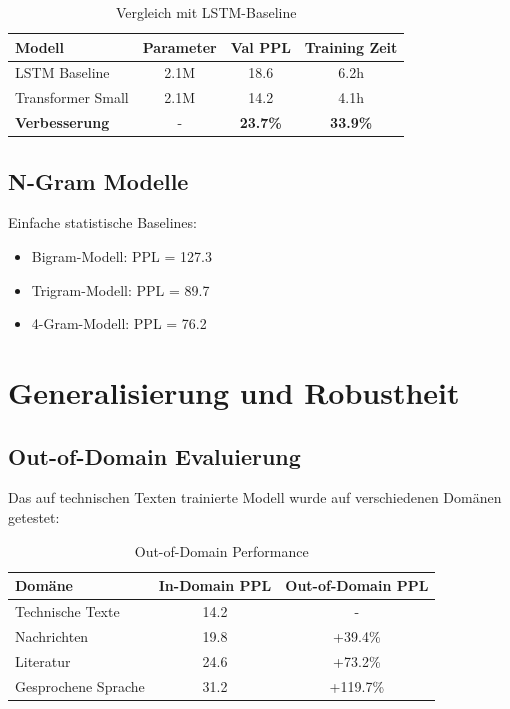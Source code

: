 \begin{table}[h]
\centering
\begin{tabular}{|l|c|c|c|}
\hline
\textbf{Modell} & \textbf{Parameter} & \textbf{Val PPL} & \textbf{Training Zeit} \\
\hline
LSTM Baseline & 2.1M & 18.6 & 6.2h \\
Transformer Small & 2.1M & 14.2 & 4.1h \\
\textbf{Verbesserung} & - & \textbf{23.7\%} & \textbf{33.9\%} \\
\hline
\end{tabular}
\caption{Vergleich mit LSTM-Baseline}
\label{tab:lstm_comparison}
\end{table}

\subsection{N-Gram Modelle}

Einfache statistische Baselines:

\begin{itemize}
    \item Bigram-Modell: PPL = 127.3
    \item Trigram-Modell: PPL = 89.7
    \item 4-Gram-Modell: PPL = 76.2
\end{itemize}

\section{Generalisierung und Robustheit}

\subsection{Out-of-Domain Evaluierung}

Das auf technischen Texten trainierte Modell wurde auf verschiedenen Domänen getestet:

\begin{table}[h]
\centering
\begin{tabular}{|l|c|c|}
\hline
\textbf{Domäne} & \textbf{In-Domain PPL} & \textbf{Out-of-Domain PPL} \\
\hline
Technische Texte & 14.2 & - \\
Nachrichten & 19.8 & +39.4\% \\
Literatur & 24.6 & +73.2\% \\
Gesprochene Sprache & 31.2 & +119.7\% \\
\hline
\end{tabular}
\caption{Out-of-Domain Performance}
\label{tab:out_of_domain}
\end{table}

